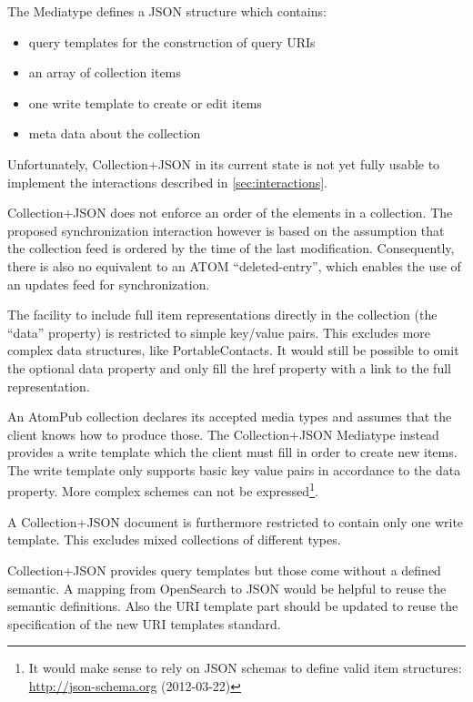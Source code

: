\documentclass[12pt,a4paper,twoside]{scrartcl}		%
\newcommand{\citeurl}[2]{\url{#1} (#2)}
\begin{document}
The Mediatype defines a JSON structure which contains:

\begin{itemize}
\item query templates for the construction of query URIs
\item an array of collection items
\item one write template to create or edit items
\item meta data about the collection
\end{itemize}

Unfortunately, Collection+JSON in its current state is not yet fully usable to
implement the interactions described in \ref{sec:interactions}.

Collection+JSON does not enforce an order of the elements in a collection. The
proposed synchronization interaction however is based on the assumption that the
collection feed is ordered by the time of the last modification. Consequently,
there is also no equivalent to an ATOM
``deleted-entry''\cite{draft-snell-atompub-tombstones-14}, which enables the use
of an updates feed for synchronization.

The facility to include full item representations directly in the collection
(the ``data'' property) is restricted to simple key/value pairs. This excludes
more complex data structures, like PortableContacts. It would still be possible
to omit the optional data property and only fill the href property with a link
to the full representation.

An AtomPub collection declares its accepted media types and assumes that the
client knows how to produce those. The Collection+JSON Mediatype instead
provides a write template which the client must fill in order to create new
items. The write template only supports basic key value pairs in accordance to
the data property. More complex schemes can not be expressed\footnote{It would
  make sense to rely on JSON schemas to define valid item structures:
  \citeurl{http://json-schema.org}{2012-03-22}}.

A Collection+JSON document is furthermore restricted to contain only one write
template. This excludes mixed collections of different types.

Collection+JSON provides query templates but those come without a defined
semantic. A mapping from OpenSearch to JSON would be helpful to reuse the
semantic definitions. Also the URI template part should be updated to reuse the
specification of the new URI templates standard\cite{RFC6570}.
\end{document}
